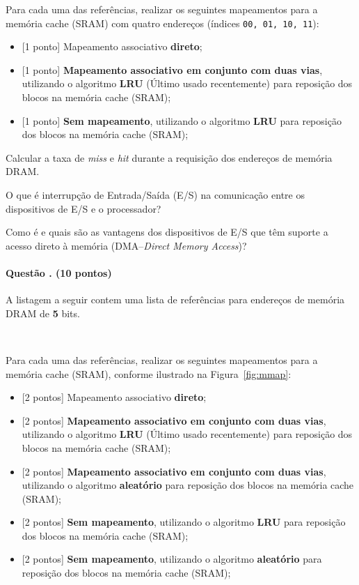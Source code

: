 Para cada uma das referências, realizar os seguintes mapeamentos para
a memória cache (SRAM) com quatro endereços (índices {\tt 00, 01, 10, 11}):

\begin{itemize}
\item{\tiny [1 ponto]} Mapeamento associativo {\bf direto};
\item{\tiny [1 ponto]} {\bf Mapeamento associativo em conjunto com duas vias}, utilizando o
  algoritmo {\bf LRU} (Último usado recentemente) para
  reposição dos blocos na memória cache (SRAM);
\item{\tiny [1 ponto]} {\bf Sem mapeamento}, utilizando o algoritmo {\bf LRU} para
  reposição dos blocos na memória cache (SRAM);
\end{itemize}

\noindent{\tiny [1 ponto]} Calcular a taxa de {\em miss} e {\em hit}
durante a requisição dos endereços de memória DRAM.

 O que é interrupção de Entrada/Saída (E/S) na comunicação
entre os dispositivos de E/S e o processador?

 Como é e quais são as vantagens dos dispositivos de E/S que têm suporte a
acesso direto à memória (DMA--\emph{Direct Memory Access})?


\paragraph{Questão \newex{}. (10 pontos)}
A listagem a seguir contem uma lista de referências para endereços
de memória DRAM de {\bf 5} bits.

\begin{center}
  \tt
 \rand{} \rand{}
 \rand{} \rand{} \rand{} \rand{}
 \rand{} \rand{} \rand{} \rand{} \\
\end{center}

Para cada uma das referências, realizar os seguintes mapeamentos para
a memória cache (SRAM), conforme ilustrado na Figura~\ref{fig:mmap}:

\begin{itemize}
\item{\tiny [2 pontos]} Mapeamento associativo {\bf direto};
\item{\tiny [2 pontos]} {\bf Mapeamento associativo em conjunto com duas vias}, utilizando o
  algoritmo {\bf LRU} (Último usado recentemente) para
  reposição dos blocos na memória cache (SRAM);
\item{\tiny [2 pontos]} {\bf Mapeamento associativo em conjunto com duas
  vias}, utilizando o algoritmo {\bf aleatório }
  para reposição dos blocos na memória cache (SRAM);
\item{\tiny [2 pontos]} {\bf Sem mapeamento}, utilizando o algoritmo {\bf LRU} para
  reposição dos blocos na memória cache (SRAM);
\item{\tiny [2 pontos]} {\bf Sem mapeamento}, utilizando o algoritmo {\bf aleatório } para
  reposição dos blocos na memória cache (SRAM);
\end{itemize}


